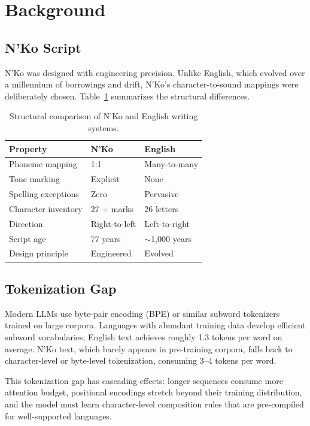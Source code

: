 \documentclass[11pt]{article}
\begin{document}
\section{Background}

\subsection{N'Ko Script}

N'Ko was designed with engineering precision.
Unlike English, which evolved over a millennium of borrowings and drift, N'Ko's character-to-sound mappings were deliberately chosen.
Table~\ref{tab:nko-vs-english} summarizes the structural differences.

\begin{table}[t]
\centering
\small
\begin{tabular}{lll}
\toprule
\textbf{Property} & \textbf{N'Ko} & \textbf{English} \\
\midrule
Phoneme mapping & 1:1 & Many-to-many \\
Tone marking & Explicit & None \\
Spelling exceptions & Zero & Pervasive \\
Character inventory & 27 + marks & 26 letters \\
Direction & Right-to-left & Left-to-right \\
Script age & 77 years & $\sim$1,000 years \\
Design principle & Engineered & Evolved \\
\bottomrule
\end{tabular}
\caption{Structural comparison of N'Ko and English writing systems.}
\label{tab:nko-vs-english}
\end{table}

\subsection{Tokenization Gap}

Modern LLMs use byte-pair encoding (BPE) or similar subword tokenizers trained on large corpora.
Languages with abundant training data develop efficient subword vocabularies; English text achieves roughly 1.3 tokens per word on average.
N'Ko text, which barely appears in pre-training corpora, falls back to character-level or byte-level tokenization, consuming 3--4 tokens per word.

This tokenization gap has cascading effects: longer sequences consume more attention budget, positional encodings stretch beyond their training distribution, and the model must learn character-level composition rules that are pre-compiled for well-supported languages.
\end{document}
